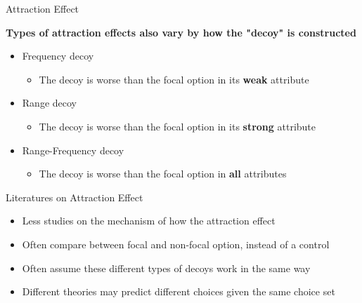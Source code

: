 \documentclass[
  ignorenonframetext,
  aspectratio=169]{beamer}
\begin{document}
\begin{frame}{Attraction Effect}
\label{attraction-effect}
\begin{center}
  \textbf{Types of attraction effects also vary by how the "decoy" is constructed}
\end{center}

\pause
\begin{itemize}
  \item Frequency decoy
  \begin{itemize}
    \item The decoy is worse than the focal option in its \textbf{weak} attribute
  \end{itemize}
  \pause
  \item Range decoy
  \begin{itemize}
    \item The decoy is worse than the focal option in its \textbf{strong} attribute
  \end{itemize}
  \pause
  \item Range-Frequency decoy
  \begin{itemize}
    \item The decoy is worse than the focal option in \textbf{all} attributes
  \end{itemize}
\end{itemize}
\end{frame}

\begin{frame}{Literatures on Attraction Effect}
\label{literatures-on-attraction-effect}
\begin{itemize}
  \pause
  \item Less studies on the mechanism of how the attraction effect
  \pause
  \item Often compare between focal and non-focal option, instead of a control
  \pause
  \item Often assume these different types of decoys work in the same way
  \pause
  \item Different theories may predict different choices given the same choice set
\end{itemize}
\end{frame}
\end{document}
